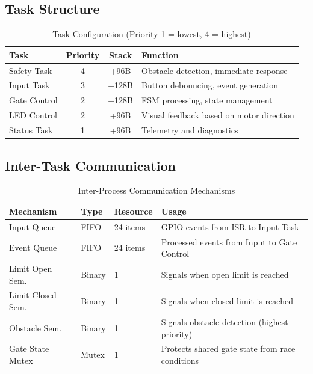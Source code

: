 \documentclass[11pt,a4paper]{article}
\begin{document}
\subsection{Task Structure}

\begin{table}[H]
\centering
\small
\begin{tabularx}{\textwidth}{lccX}
\toprule
\textbf{Task} & \textbf{Priority} & \textbf{Stack} & \textbf{Function} \\
\midrule
Safety Task & 4 & +96B & Obstacle detection, immediate response \\
Input Task & 3 & +128B & Button debouncing, event generation \\
Gate Control & 2 & +128B & FSM processing, state management \\
LED Control & 2 & +96B & Visual feedback based on motor direction \\
Status Task & 1 & +96B & Telemetry and diagnostics \\
\bottomrule
\end{tabularx}
\caption{Task Configuration (Priority 1 = lowest, 4 = highest)}
\label{tab:tasks}
\end{table}

\subsection{Inter-Task Communication}

\begin{table}[H]
\centering
\small
\begin{tabularx}{\textwidth}{lllX}
\toprule
\textbf{Mechanism} & \textbf{Type} & \textbf{Resource} & \textbf{Usage} \\
\midrule
Input Queue & FIFO & 24 items & GPIO events from ISR to Input Task \\
Event Queue & FIFO & 24 items & Processed events from Input to Gate Control \\
Limit Open Sem. & Binary & 1 & Signals when open limit is reached \\
Limit Closed Sem. & Binary & 1 & Signals when closed limit is reached \\
Obstacle Sem. & Binary & 1 & Signals obstacle detection (highest priority) \\
Gate State Mutex & Mutex & 1 & Protects shared gate state from race conditions \\
\bottomrule
\end{tabularx}
\caption{Inter-Process Communication Mechanisms}
\label{tab:ipc}
\end{table}
\end{document}
